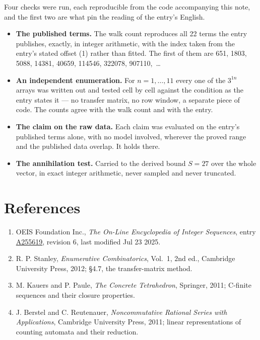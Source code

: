 \documentclass[11pt]{article}
\theoremstyle{definition}
\begin{document}
Four checks were run, each reproducible from the code accompanying this note, and the first two are what pin the reading of the entry's English.

\begin{itemize}

\item {\bfseries The published terms.} The walk count reproduces all 22 terms the entry publishes, exactly, in integer arithmetic, with the index taken from the entry's stated offset (1) rather than fitted. The first of them are 651, 1803, 5088, 14381, 40659, 114546, 322078, 907110,~\dots

\item {\bfseries An independent enumeration.} For $n = 1,\dots,11$ every one of the $3^{1n}$ arrays was written out and tested cell by cell against the condition as the entry states it --- no transfer matrix, no row window, a separate piece of code. The counts agree with the walk count and with the entry.

\item {\bfseries The claim on the raw data.} Each claim was evaluated on the entry's published terms alone, with no model involved, wherever the proved range and the published data overlap. It holds there.

\item {\bfseries The annihilation test.} Carried to the derived bound $S = 27$ over the whole vector, in exact integer arithmetic, never sampled and never truncated.

\end{itemize}

\section{References}

\begin{enumerate}

\item OEIS Foundation Inc., \emph{The On-Line Encyclopedia of Integer Sequences}, entry \href{https://oeis.org/A255619}{A255619}, revision 6, last modified Jul 23 2025.

\item R. P. Stanley, \emph{Enumerative Combinatorics}, Vol.~1, 2nd ed., Cambridge University Press, 2012; \S4.7, the transfer-matrix method.

\item M. Kauers and P. Paule, \emph{The Concrete Tetrahedron}, Springer, 2011; C-finite sequences and their closure properties.

\item J. Berstel and C. Reutenauer, \emph{Noncommutative Rational Series with Applications}, Cambridge University Press, 2011; linear representations of counting automata and their reduction.

\end{enumerate}
\end{document}
